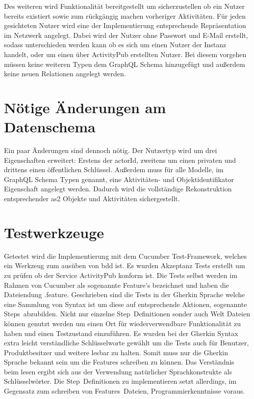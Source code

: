 Des weiteren wird Funktionalität bereitgestellt um sicherzustellen ob ein Nutzer bereits existiert sowie zum rückgängig machen vorheriger Aktivitäten. Für jeden gesichteten Nutzer wird eine der Implementierung entsprechende Repräsentation im Netzwerk angelegt. Dabei wird der Nutzer ohne Passwort und E-Mail erstellt, sodass unterschieden werden kann ob es sich um einen Nutzer der Instanz handelt, oder um einen über ActivityPub erstellten Nutzer. Bei diesem vorgehen müssen keine weiteren Typen dem GraphQL Schema hinzugefügt und außerdem keine neuen Relationen angelegt werden.

\section{Nötige Änderungen am Datenschema}
Ein paar Änderungen sind dennoch nötig. Der Nutzertyp wird um drei Eigenschaften erweitert: Erstens der \glqq actorId\grqq, zweitens um einen privaten und drittens einen öffentlichen Schlüssel. Außerdem muss für alle Modelle, im GraphQL Schema Typen genannt, eine Aktivitäten- und Objektidentifikator Eigenschaft angelegt werden. Dadurch wird die vollständige Rekonstruktion entsprechender \gls{as2} Objekte und Aktivitäten sichergestellt.

\section{Testwerkzeuge}
Getestet wird die Implementierung mit dem Cucumber Test-Framework, welches ein Werkzeug zum ausüben von \gls{bdd} ist. Es wurden Akzeptanz Tests erstellt um zu prüfen ob der Service ActivityPub konform ist. Die Tests selbst werden im Rahmen von Cucumber als sogenannte \glqq Feature\grqq's bezeichnet und haben die Dateiendung \glqq .feature\grqq. Geschrieben sind die Tests in der Gherkin Sprache welche eine Sammlung von Syntax ist um diese auf entsprechende Aktionen, sogenannte \glqq Steps\grqq~abzubilden. Nicht nur einzelne \glqq Step\grqq~Definitionen sonder auch Welt Dateien können genutzt werden um einen Ort für wiederverwendbare Funktionalität zu haben und einen Testzustand einzuführen. Es wurden bei der Gherkin Syntax extra leicht verständliche Schlüsselworte gewählt um die Tests auch für Benutzer, Produktbesitzer und weitere lesbar zu halten. Somit muss nur die Gherkin Sprache bekannt sein um die Features schreiben zu können. Das Verständnis beim lesen ergibt sich aus der Verwendung natürlicher Sprachkonstrukte als Schlüsselwörter. Die \glqq Step\grqq~Definitionen zu implementieren setzt allerdings, im Gegensatz zum schreiben von \glqq Features\grqq~Dateien, Programmierkenntnisse voraus.

